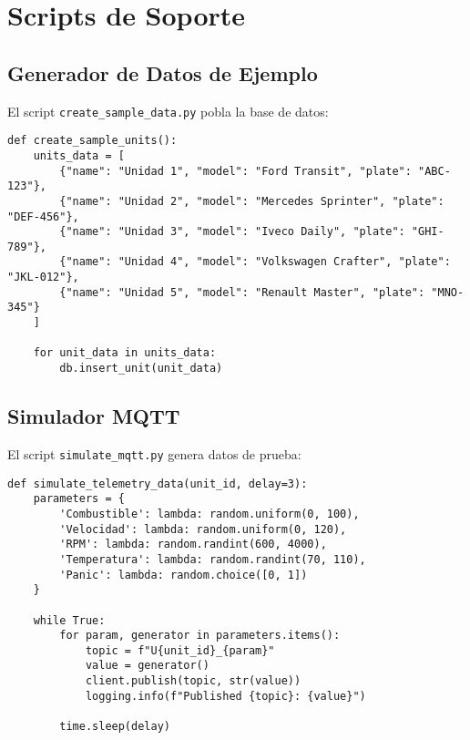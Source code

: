 \section{Scripts de Soporte}

\subsection{Generador de Datos de Ejemplo}

El script \texttt{create\_sample\_data.py} pobla la base de datos:

\begin{verbatim}
def create_sample_units():
    units_data = [
        {"name": "Unidad 1", "model": "Ford Transit", "plate": "ABC-123"},
        {"name": "Unidad 2", "model": "Mercedes Sprinter", "plate": "DEF-456"},
        {"name": "Unidad 3", "model": "Iveco Daily", "plate": "GHI-789"},
        {"name": "Unidad 4", "model": "Volkswagen Crafter", "plate": "JKL-012"},
        {"name": "Unidad 5", "model": "Renault Master", "plate": "MNO-345"}
    ]
    
    for unit_data in units_data:
        db.insert_unit(unit_data)
\end{verbatim}

\subsection{Simulador MQTT}

El script \texttt{simulate\_mqtt.py} genera datos de prueba:

\begin{verbatim}
def simulate_telemetry_data(unit_id, delay=3):
    parameters = {
        'Combustible': lambda: random.uniform(0, 100),
        'Velocidad': lambda: random.uniform(0, 120),
        'RPM': lambda: random.randint(600, 4000),
        'Temperatura': lambda: random.randint(70, 110),
        'Panic': lambda: random.choice([0, 1])
    }
    
    while True:
        for param, generator in parameters.items():
            topic = f"U{unit_id}_{param}"
            value = generator()
            client.publish(topic, str(value))
            logging.info(f"Published {topic}: {value}")
        
        time.sleep(delay)
\end{verbatim}
